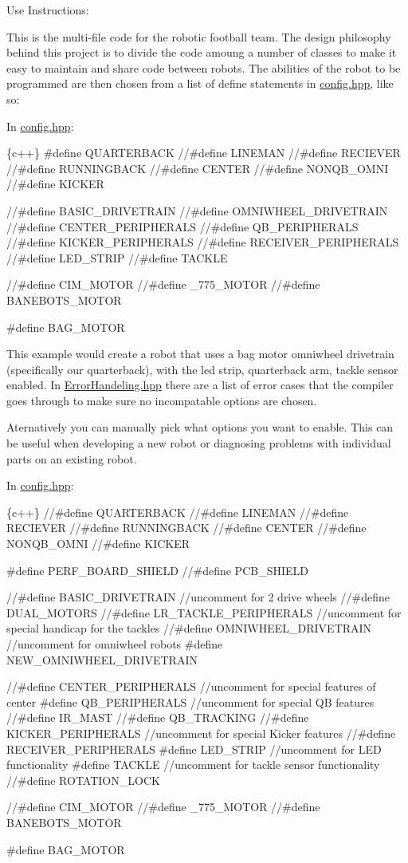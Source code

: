 Use Instructions\+:

This is the multi-\/file code for the robotic football team. The design philosophy behind this project is to divide the code amoung a number of classes to make it easy to maintain and share code between robots. The abilities of the robot to be programmed are then chosen from a list of define statements in \mbox{\hyperlink{_config_8hpp_source}{config.\+hpp}}, like so\+:

In \mbox{\hyperlink{_config_8hpp_source}{config.\+hpp}}\+: 
\begin{DoxyCode}
\{c++\}
#define QUARTERBACK
//#define LINEMAN
//#define RECIEVER
//#define RUNNINGBACK
//#define CENTER
//#define NONQB\_OMNI
//#define KICKER

//#define BASIC\_DRIVETRAIN
//#define OMNIWHEEL\_DRIVETRAIN
//#define CENTER\_PERIPHERALS
//#define QB\_PERIPHERALS
//#define KICKER\_PERIPHERALS
//#define RECEIVER\_PERIPHERALS
//#define LED\_STRIP
//#define TACKLE

//#define CIM\_MOTOR
//#define \_775\_MOTOR
//#define BANEBOTS\_MOTOR

#define BAG\_MOTOR
\end{DoxyCode}
 This example would create a robot that uses a bag motor omniwheel drivetrain (specifically our quarterback), with the led strip, quarterback arm, tackle sensor enabled. In \mbox{\hyperlink{_error_handeling_8hpp_source}{Error\+Handeling.\+hpp}} there are a list of error cases that the compiler goes through to make sure no incompatable options are chosen.

Aternatively you can manually pick what options you want to enable. This can be useful when developing a new robot or diagnosing problems with individual parts on an existing robot.

In \mbox{\hyperlink{_config_8hpp_source}{config.\+hpp}}\+: 
\begin{DoxyCode}
\{c++\}
//#define QUARTERBACK
//#define LINEMAN
//#define RECIEVER
//#define RUNNINGBACK
//#define CENTER
//#define NONQB\_OMNI
//#define KICKER

#define PERF\_BOARD\_SHIELD
//#define PCB\_SHIELD

//#define BASIC\_DRIVETRAIN    //uncomment for 2 drive wheels
//#define DUAL\_MOTORS
//#define LR\_TACKLE\_PERIPHERALS         //uncomment for special handicap for the tackles
//#define OMNIWHEEL\_DRIVETRAIN  //uncomment for omniwheel robots
#define NEW\_OMNIWHEEL\_DRIVETRAIN

//#define CENTER\_PERIPHERALS  //uncomment for special features of center 
#define QB\_PERIPHERALS      //uncomment for special QB features
//#define IR\_MAST
//#define QB\_TRACKING
//#define KICKER\_PERIPHERALS  //uncomment for special Kicker features
//#define RECEIVER\_PERIPHERALS  
#define LED\_STRIP       //uncomment for LED functionality
#define TACKLE          //uncomment for tackle sensor functionality
//#define ROTATION\_LOCK

//#define CIM\_MOTOR
//#define \_775\_MOTOR
//#define BANEBOTS\_MOTOR

#define BAG\_MOTOR
\end{DoxyCode}


